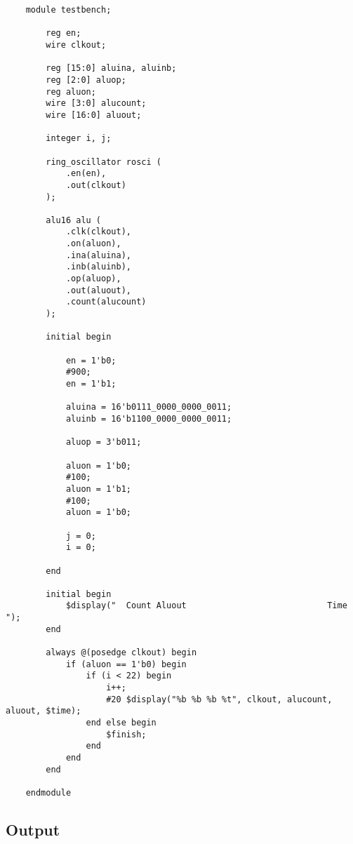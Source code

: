 \documentclass[../main]{subfiles}
\begin{document}
\begin{verbatim}
    module testbench;

        reg en;
        wire clkout;

        reg [15:0] aluina, aluinb;
        reg [2:0] aluop;
        reg aluon;
        wire [3:0] alucount;
        wire [16:0] aluout;

        integer i, j;

        ring_oscillator rosci (
            .en(en),
            .out(clkout)
        );

        alu16 alu (
            .clk(clkout),
            .on(aluon),
            .ina(aluina),
            .inb(aluinb),
            .op(aluop),
            .out(aluout),
            .count(alucount)
        );

        initial begin

            en = 1'b0;
            #900;
            en = 1'b1;

            aluina = 16'b0111_0000_0000_0011;
            aluinb = 16'b1100_0000_0000_0011;

            aluop = 3'b011;

            aluon = 1'b0;
            #100;
            aluon = 1'b1;
            #100;
            aluon = 1'b0;

            j = 0;
            i = 0;

        end

        initial begin
            $display("  Count Aluout                            Time ");
        end

        always @(posedge clkout) begin
            if (aluon == 1'b0) begin
                if (i < 22) begin
                    i++;
                    #20 $display("%b %b %b %t", clkout, alucount, aluout, $time);
                end else begin
                    $finish;
                end
            end
        end

    endmodule
\end{verbatim}

\subsection {Output}
\end{document}
